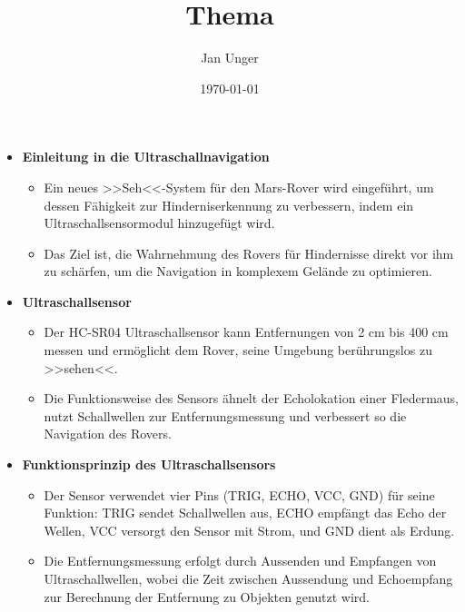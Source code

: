 \documentclass{vorlage-design-main}
\title{Thema}
\author{Jan Unger}
\date{\today}
\begin{document}
\maketitle

\begin{abstract}

\end{abstract}

\begin{itemize}

\item
  \textbf{Einleitung in die Ultraschallnavigation}

  \begin{itemize}
  
  \item
    Ein neues >>Seh<<-System für den Mars-Rover wird eingeführt, um
    dessen Fähigkeit zur Hinderniserkennung zu verbessern, indem ein
    Ultraschallsensormodul hinzugefügt wird.
  \item
    Das Ziel ist, die Wahrnehmung des Rovers für Hindernisse direkt vor
    ihm zu schärfen, um die Navigation in komplexem Gelände zu
    optimieren.
  \end{itemize}
\item
  \textbf{Ultraschallsensor}

  \begin{itemize}
  
  \item
    Der HC-SR04 Ultraschallsensor kann Entfernungen von 2 cm bis 400 cm
    messen und ermöglicht dem Rover, seine Umgebung berührungslos zu
    >>sehen<<.
  \item
    Die Funktionsweise des Sensors ähnelt der Echolokation einer
    Fledermaus, nutzt Schallwellen zur Entfernungsmessung und verbessert
    so die Navigation des Rovers.
  \end{itemize}
\item
  \textbf{Funktionsprinzip des Ultraschallsensors}

  \begin{itemize}
  
  \item
    Der Sensor verwendet vier Pins (TRIG, ECHO, VCC, GND) für seine
    Funktion: TRIG sendet Schallwellen aus, ECHO empfängt das Echo der
    Wellen, VCC versorgt den Sensor mit Strom, und GND dient als Erdung.
  \item
    Die Entfernungsmessung erfolgt durch Aussenden und Empfangen von
    Ultraschallwellen, wobei die Zeit zwischen Aussendung und
    Echoempfang zur Berechnung der Entfernung zu Objekten genutzt wird.
  \end{itemize}
\end{itemize}
\end{document}
